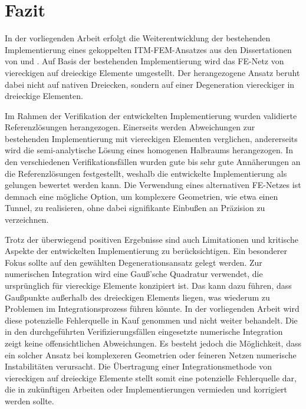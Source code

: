 \chapter{Fazit}
\label{cha:Schluss}

In der vorliegenden Arbeit erfolgt die Weiterentwicklung der bestehenden Implementierung eines gekoppelten ITM-FEM-Ansatzes aus den Dissertationen von \cite{Hackenberg2016} und \cite{Freisinger2022}. 
Auf Basis der bestehenden Implementierung wird das FE-Netz von viereckigen auf dreieckige Elemente umgestellt. Der herangezogene Ansatz beruht dabei nicht auf nativen Dreiecken, sondern auf einer Degeneration viereckiger in dreieckige Elementen. 

Im Rahmen der Verifikation der entwickelten Implementierung wurden validierte Referenzlösungen herangezogen. 
Einerseits werden Abweichungen zur bestehenden Implementierung mit viereckigen Elementen verglichen, andererseits wird die semi-analytische Lösung eines homogenen Halbraums herangezogen.
In den verschiedenen Verifikationsfällen wurden gute bis sehr gute Annäherungen an die Referenzlösungen festgestellt, weshalb die entwickelte Implementierung als gelungen bewertet werden kann. 
Die Verwendung eines alternativen FE-Netzes ist demnach eine mögliche Option, um komplexere Geometrien, wie etwa einen Tunnel, zu realisieren, ohne dabei signifikante Einbußen an Präzision zu verzeichnen.

Trotz der überwiegend positiven Ergebnisse sind auch Limitationen und kritische Aspekte der entwickelten Implementierung zu berücksichtigen. 
Ein besonderer Fokus sollte auf den gewählten Degenerationsansatz gelegt werden. Zur numerischen Integration wird eine Gauß'sche Quadratur verwendet, die ursprünglich für viereckige Elemente konzipiert ist. 
Das kann dazu führen, dass Gaußpunkte außerhalb des dreieckigen Elements liegen, was wiederum zu Problemen im Integrationsprozess führen könnte. 
In der vorliegenden Arbeit wird diese potenzielle Fehlerquelle in Kauf genommen und nicht weiter behandelt. 
Die in den durchgeführten Verifizierungsfällen eingesetzte numerische Integration zeigt keine offensichtlichen Abweichungen.
Es besteht jedoch die Möglichkeit, dass ein solcher Ansatz bei komplexeren Geometrien oder feineren Netzen numerische Instabilitäten verursacht.
Die Übertragung einer Integrationsmethode von viereckigen auf dreieckige Elemente stellt somit eine potenzielle Fehlerquelle dar, die in zukünftigen Arbeiten oder Implementierungen vermieden und korrigiert werden sollte.

